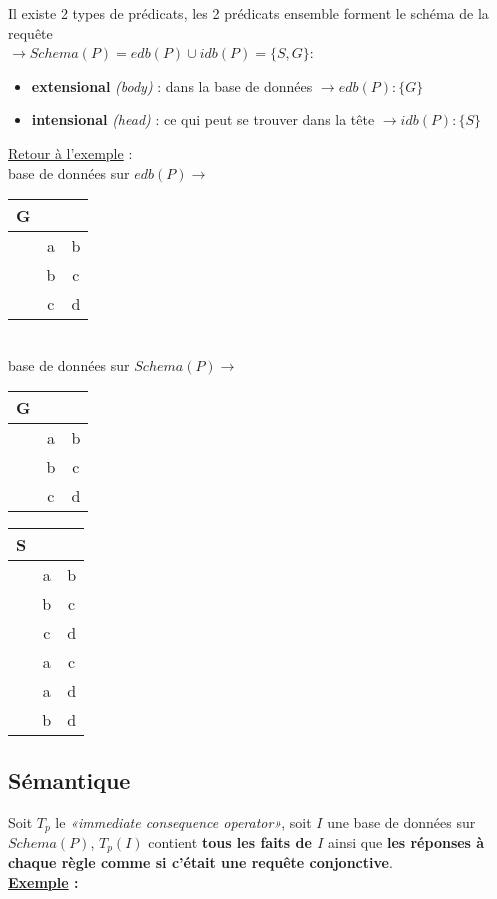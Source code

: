 \documentclass{article}
\begin{document}
Il existe 2 types de prédicats, les 2 prédicats ensemble forment le schéma de la requête \\ $\rightarrow Schema(P) = edb(P)\cup idb(P) = \{S,G\}$: 
\begin{itemize}
\item \textbf{extensional} \textit{(body)} : dans la base de données $\rightarrow edb(P) : \{G\}$
\item \textbf{intensional} \textit{(head)} : ce qui peut se trouver dans la tête $\rightarrow idb(P) : \{S\}$ \\
\end{itemize}
\underline{Retour à l'exemple} : \\
 base de données sur $edb(P) \rightarrow$ 
	\begin{tabular}{r|cc}
	G& & \\
	\hline
	& a & b\\
	& b & c\\
	& c & d\\
	\end{tabular} \\
base de données sur $Schema(P) \rightarrow$
	\begin{tabular}{r|cc}
	G& & \\
	\hline
	& a & b\\
	& b & c\\
	& c & d\\
	\end{tabular}
	\begin{tabular}{r|cc}
	S& & \\
	\hline
	& a & b\\
	& b & c\\
	& c & d\\
	& a & c\\	
	& a & d\\
	& b & d\\
	\end{tabular}
\newpage
\subsection{Sémantique}

Soit $T_p$ le \textit{«immediate consequence operator»}, soit $I$ une base de données sur $Schema(P)$, $T_p(I)$ contient \textbf{tous les faits de $I$} ainsi que 
\textbf{les réponses à chaque règle comme si c'était une requête conjonctive}. \\

\noindent\textbf{\underline{Exemple} : } \\
\end{document}
